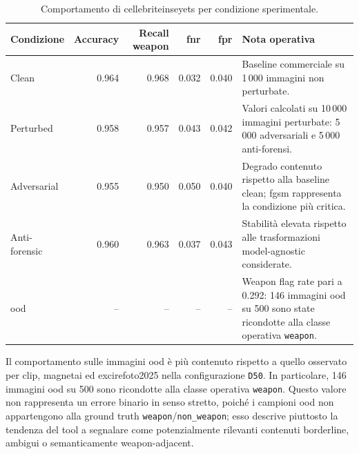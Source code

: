 \begin{table}[H]
\centering
\caption{Comportamento di \gls{cellebriteinseyets} per condizione sperimentale.}
\label{tab:results-cellebrite-condition-metrics}
\small
\begin{tabularx}{\textwidth}{@{}l r r r r X@{}}
\toprule
\textbf{Condizione} & \textbf{Accuracy} & \textbf{Recall weapon} & \textbf{\gls{fnr}} & \textbf{\gls{fpr}} & \textbf{Nota operativa} \\
\midrule
Clean & 0.964 & 0.968 & 0.032 & 0.040 & Baseline commerciale su 1\,000 immagini non perturbate. \\
Perturbed & 0.958 & 0.957 & 0.043 & 0.042 & Valori calcolati su 10\,000 immagini perturbate: 5\,000 adversariali e 5\,000 anti-forensi. \\
Adversarial & 0.955 & 0.950 & 0.050 & 0.040 & Degrado contenuto rispetto alla baseline clean; \gls{fgsm} rappresenta la condizione più critica. \\
Anti-forensic & 0.960 & 0.963 & 0.037 & 0.043 & Stabilità elevata rispetto alle trasformazioni model-agnostic considerate. \\
\gls{ood} & -- & -- & -- & -- & Weapon flag rate pari a 0.292: 146 immagini \gls{ood} su 500 sono state ricondotte alla classe operativa \texttt{weapon}. \\
\bottomrule
\end{tabularx}
\end{table}

Il comportamento sulle immagini \gls{ood} è più contenuto rispetto a quello
osservato per \gls{clip}, \gls{magnetai} ed \gls{excirefoto2025} nella
configurazione \texttt{D50}. In particolare, 146 immagini \gls{ood} su 500 sono
ricondotte alla classe operativa \texttt{weapon}. Questo valore non rappresenta
un errore binario in senso stretto, poiché i campioni \gls{ood} non appartengono
alla ground truth \texttt{weapon}/\texttt{non\_weapon}; esso descrive piuttosto
la tendenza del tool a segnalare come potenzialmente rilevanti contenuti
borderline, ambigui o semanticamente weapon-adjacent.

